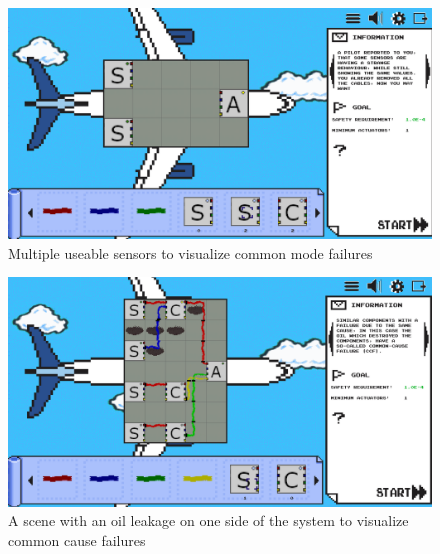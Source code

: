 \begin{figure}
    \centering
    \includegraphics[width=\textwidth]{Pictures/res/implementation/scenes/cmf}
    \caption{Multiple useable sensors to visualize common mode failures}
    \label{fig:common-mode-scene}
\end{figure}
\begin{figure}
    \centering
    \includegraphics[width=\textwidth]{Pictures/res/implementation/scenes/oil-leak}
    \caption{A scene with an oil leakage on one side of the system to visualize common cause failures}
    \label{fig:common-cause-scene}
\end{figure}

